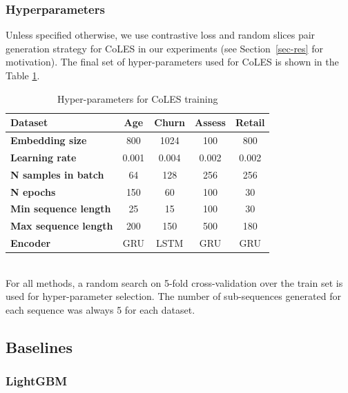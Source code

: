 \documentclass[sigconf]{acmart}
\begin{document}
\subsubsection{Hyperparameters}

Unless specified otherwise, we use contrastive loss and random slices pair generation strategy
for CoLES in our experiments (see Section~\ref{sec-res} for motivation). The final set of
hyper-parameters used for CoLES is shown in the Table \ref{tab-hyper}.

\begin{table}
    \centering
    \caption{Hyper-parameters for CoLES training}
    \begin{tabularx}{\linewidth}{Xcccc}
        \toprule
            \textbf{Dataset} & \textbf{Age} & \textbf{Churn} & \textbf{Assess} & \textbf{Retail} \\
        \midrule
            \textbf{Embedding size} & 800 & 1024 & 100 & 800 \\
            \textbf{Learning rate} & 0.001 & 0.004 & 0.002 & 0.002 \\
            \textbf{N samples in batch} & 64 & 128 & 256 & 256 \\
            \textbf{N epochs} & 150 & 60 & 100 & 30 \\
            \textbf{Min sequence length} & 25 & 15 & 100 & 30 \\
            \textbf{Max sequence length} & 200 & 150 & 500 & 180 \\
            \textbf{Encoder} & GRU & LSTM & GRU & GRU \\
        \bottomrule
    \end{tabularx}%
    \\
    \small{
        For all methods, a random search on 5-fold cross-validation over the train set is
        used for hyper-parameter selection. The number of sub-sequences generated for each
        sequence was always 5 for each dataset.
    }
    \label{tab-hyper}
\end{table}

\subsection{Baselines} \label{sec-baselines}


\subsubsection{LightGBM}
\end{document}
